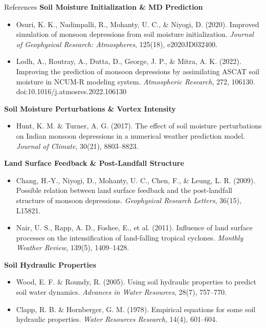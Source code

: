 \documentclass[10pt, aspectratio=169,t,xcolor=table]{beamer}
\begin{document}
\begin{frame}[allowframebreaks]{References}
	\textbf{Soil Moisture Initialization \& MD Prediction}
	\begin{itemize}\scriptsize
		\item Osuri, K. K., Nadimpalli, R., Mohanty, U. C., \& Niyogi, D. (2020). Improved simulation of monsoon depressions from soil moisture initialization. \textit{Journal of Geophysical Research: Atmospheres}, 125(18), e2020JD032400.

		\item Lodh, A., Routray, A., Dutta, D., George, J. P., \& Mitra, A. K. (2022). Improving the prediction of monsoon depressions by assimilating ASCAT soil moisture in NCUM-R modeling system. \textit{Atmospheric Research}, 272, 106130. doi:10.1016/j.atmosres.2022.106130
	\end{itemize}

	\textbf{Soil Moisture Perturbations \& Vortex Intensity}
	\begin{itemize}\scriptsize
		\item Hunt, K. M. \& Turner, A. G. (2017). The effect of soil moisture perturbations on Indian monsoon depressions in a numerical weather prediction model. \textit{Journal of Climate}, 30(21), 8803–8823.
	\end{itemize}

	\textbf{Land Surface Feedback \& Post-Landfall Structure}
	\begin{itemize}\scriptsize
		\item Chang, H.-Y., Niyogi, D., Mohanty, U. C., Chen, F., \& Leung, L. R. (2009). Possible relation between land surface feedback and the post-landfall structure of monsoon depressions. \textit{Geophysical Research Letters}, 36(15), L15821.

		\item Nair, U. S., Rapp, A. D., Foshee, E., et al. (2011). Influence of land surface processes on the intensification of land-falling tropical cyclones. \textit{Monthly Weather Review}, 139(5), 1409–1428.
	\end{itemize}

	\textbf{Soil Hydraulic Properties}
	\begin{itemize}\scriptsize
		\item Wood, E. F. \& Roundy, R. (2005). Using soil hydraulic properties to predict soil water dynamics. \textit{Advances in Water Resources}, 28(7), 757–770.

		\item Clapp, R. B. \& Hornberger, G. M. (1978). Empirical equations for some soil hydraulic properties. \textit{Water Resources Research}, 14(4), 601–604.
	\end{itemize}


\end{frame}
\end{document}

